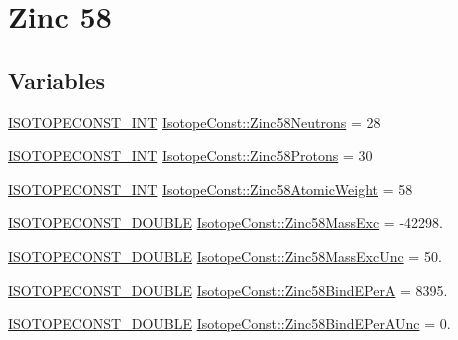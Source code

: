 \hypertarget{group___isotope_const-_zinc-_zn58}{}\section{Zinc 58}
\label{group___isotope_const-_zinc-_zn58}
\subsection*{Variables}
\begin{DoxyCompactItemize}
\item 
\mbox{\hyperlink{group___isotope_const-_macros_ga5f18360b3e99483a35c32d789e62621c}{I\+S\+O\+T\+O\+P\+E\+C\+O\+N\+S\+T\+\_\+\+I\+NT}} \mbox{\hyperlink{group___isotope_const-_zinc-_zn58_ga3996e502b770c74c47dfb70d0cb6642f}{Isotope\+Const\+::\+Zinc58\+Neutrons}} = 28
\item 
\mbox{\hyperlink{group___isotope_const-_macros_ga5f18360b3e99483a35c32d789e62621c}{I\+S\+O\+T\+O\+P\+E\+C\+O\+N\+S\+T\+\_\+\+I\+NT}} \mbox{\hyperlink{group___isotope_const-_zinc-_zn58_gac6312fc47aa8f951f031daf50f0cc7b2}{Isotope\+Const\+::\+Zinc58\+Protons}} = 30
\item 
\mbox{\hyperlink{group___isotope_const-_macros_ga5f18360b3e99483a35c32d789e62621c}{I\+S\+O\+T\+O\+P\+E\+C\+O\+N\+S\+T\+\_\+\+I\+NT}} \mbox{\hyperlink{group___isotope_const-_zinc-_zn58_gab14e738c0a806187b0858ed8d000faa2}{Isotope\+Const\+::\+Zinc58\+Atomic\+Weight}} = 58
\item 
\mbox{\hyperlink{group___isotope_const-_macros_ga8f45a7272ce02c0b4c65c44636ed719a}{I\+S\+O\+T\+O\+P\+E\+C\+O\+N\+S\+T\+\_\+\+D\+O\+U\+B\+LE}} \mbox{\hyperlink{group___isotope_const-_zinc-_zn58_ga2a57e417e32a3fddd055f670b29862fe}{Isotope\+Const\+::\+Zinc58\+Mass\+Exc}} = -\/42298.
\item 
\mbox{\hyperlink{group___isotope_const-_macros_ga8f45a7272ce02c0b4c65c44636ed719a}{I\+S\+O\+T\+O\+P\+E\+C\+O\+N\+S\+T\+\_\+\+D\+O\+U\+B\+LE}} \mbox{\hyperlink{group___isotope_const-_zinc-_zn58_gad4aec4b49abe58001986ed6b78dc700b}{Isotope\+Const\+::\+Zinc58\+Mass\+Exc\+Unc}} = 50.
\item 
\mbox{\hyperlink{group___isotope_const-_macros_ga8f45a7272ce02c0b4c65c44636ed719a}{I\+S\+O\+T\+O\+P\+E\+C\+O\+N\+S\+T\+\_\+\+D\+O\+U\+B\+LE}} \mbox{\hyperlink{group___isotope_const-_zinc-_zn58_ga5d68ff658bd680d340614a8530008b62}{Isotope\+Const\+::\+Zinc58\+Bind\+E\+PerA}} = 8395.
\item 
\mbox{\hyperlink{group___isotope_const-_macros_ga8f45a7272ce02c0b4c65c44636ed719a}{I\+S\+O\+T\+O\+P\+E\+C\+O\+N\+S\+T\+\_\+\+D\+O\+U\+B\+LE}} \mbox{\hyperlink{group___isotope_const-_zinc-_zn58_ga6ab0c662294fa7580362c598140d9985}{Isotope\+Const\+::\+Zinc58\+Bind\+E\+Per\+A\+Unc}} = 0.

\end{DoxyCompactItemize}
